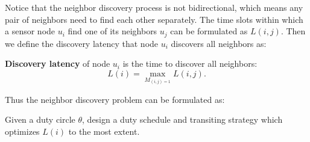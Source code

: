 Notice that the neighbor discovery process is not bidirectional, which means any pair of neighbors 
need to find each other separately. The time slots within which a sensor node $u_i$ find one of its neighbors $u_j$ can be formulated 
as $L(i,j)$. Then we define the discovery latency that node $u_i$ discovers all neighbors as:

\begin{definition}
\textbf{Discovery latency} of node $u_i$ is the time to discover all neighbors:
$$L(i) = \max_{M_{(i,j) = 1}} L (i,j).
$$
\end{definition}

Thus the neighbor discovery problem can be formulated as:
\begin{problem}
Given a duty circle $\theta$, design a duty schedule and transiting strategy which optimizes $L(i)$ to the most extent. 
\end{problem}



